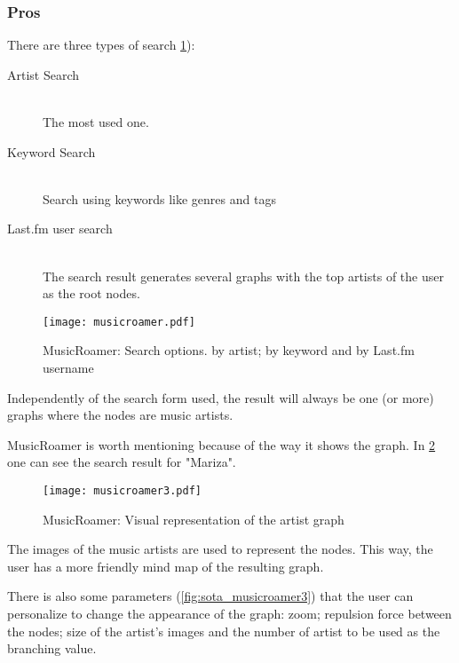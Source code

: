   \subsubsection{Pros} %
  \label{ssub:pros}

  There are three types of search \ref{fig:sota_musicroamer}): 

  \begin{description}
    \item[Artist Search] \hfill \\
      The most used one.
    \item[Keyword Search] \hfill \\
      Search using keywords like genres and tags
    \item[Last.fm user search] \hfill \\
      The search result generates several graphs with the top artists of the user as the root nodes.
  \end{description}

  \begin{figure}[tb]
    \begin{center}
      \texttt{[image: musicroamer.pdf]}
    \end{center}
    \caption{MusicRoamer: Search options. by artist; by keyword and by Last.fm username}
    \label{fig:sota_musicroamer}
  \end{figure}

  Independently of the search form used, the result will always be one (or more) graphs where the nodes are music artists.

  MusicRoamer is worth mentioning because of the way it shows the graph.
  In \ref{fig:sota_musicroamer2} one can see the search result for "Mariza".

  \begin{figure}[tb]
    \begin{center}
      \texttt{[image: musicroamer3.pdf]}
    \end{center}
    \caption{MusicRoamer: Visual representation of the artist graph}
    \label{fig:sota_musicroamer2}
  \end{figure}

  The images of the music artists are used to represent the nodes. This way, the user has a more friendly mind map of the resulting graph.

  There is also some parameters (\ref{fig:sota_musicroamer3}) that the user can personalize to change the appearance of the graph: zoom; repulsion force between the nodes; size of the artist's images and the number of artist to be used as the branching value.

